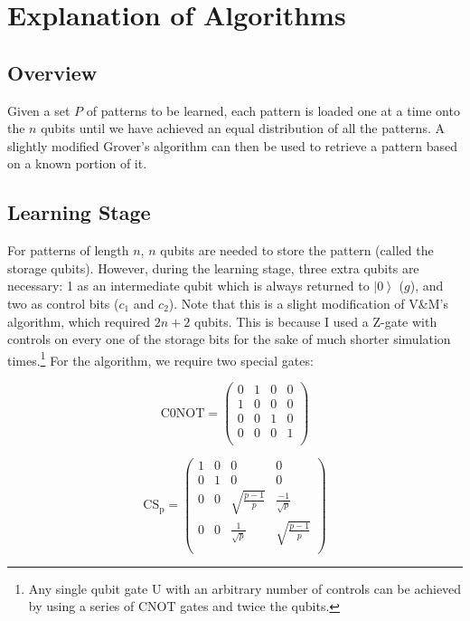 \documentclass[11pt]{article}
\begin{document}
\section{Explanation of Algorithms}

\subsection{Overview}

Given a set $P$ of patterns to be learned, each pattern is loaded one at a time onto the $n$ qubits until we have achieved an equal distribution of all the patterns. A slightly modified Grover's algorithm can then be used to retrieve a pattern based on a known portion of it.

\subsection{Learning Stage}

For patterns of length $n$, $n$ qubits are needed to store the pattern (called the storage qubits). However, during the learning stage, three extra qubits are necessary: 1 as an intermediate qubit which is always returned to $ \left | 0 \right \rangle$ ($g$), and two as control bits ($c_1$ and $c_2$). Note that this is a slight modification of V\&M's algorithm, which required $2n+2$ qubits. This is because I used a Z-gate with controls on every one of the storage bits for the sake of much shorter simulation times.\footnote{Any single qubit gate U with an arbitrary number of controls can be achieved by using a series of CNOT gates and twice the qubits.} For the algorithm, we require two special gates:

$$\mathrm{C0NOT}=\begin{pmatrix}
0 & 1 & 0 & 0 \\
1 & 0 & 0 & 0 \\
0 & 0 & 1 & 0 \\
0 & 0 & 0 & 1 \\
\end{pmatrix}$$

$$\mathrm{CS_p}=\begin{pmatrix}
1 & 0 & 0 & 0 \\
0 & 1 & 0 & 0 \\
0 & 0 & \sqrt{\frac{p-1}{p}} & \frac{-1}{\sqrt{p}} \\
0 & 0 & \frac{1}{\sqrt{p}} & \sqrt{\frac{p-1}{p}} \\
\end{pmatrix}$$
\end{document}
